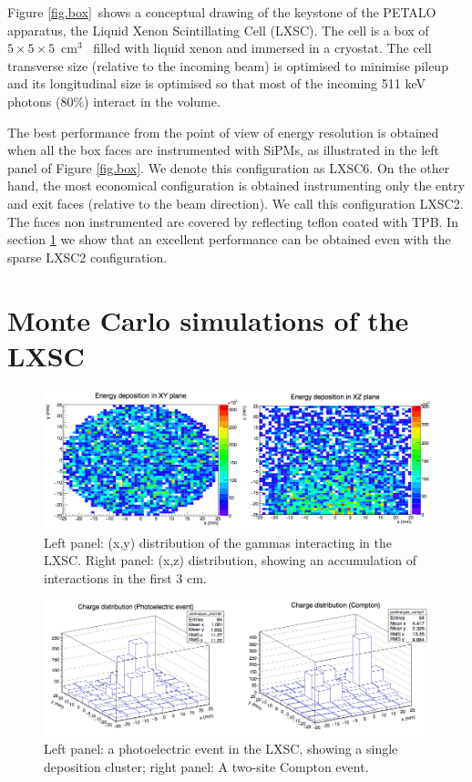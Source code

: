 \documentclass{JINST}
\begin{document}
Figure \ref{fig.box}~shows a conceptual drawing of the keystone of the PETALO apparatus, the Liquid Xenon Scintillating Cell (LXSC). The cell is a box of $5\times 5 \times 5$~cm$^3$~ filled with liquid xenon and immersed in a cryostat. The cell transverse size (relative to the incoming beam) is optimised to minimise pileup and its longitudinal size is optimised so that most of the incoming 511 keV photons (80\%) interact in the volume. 

The best performance from the point of view of energy resolution is obtained when all the box faces are instrumented with SiPMs, as illustrated in the left panel of Figure \ref{fig.box}. We denote this configuration as LXSC6. On the other hand, the most economical configuration is obtained instrumenting only the entry and exit faces (relative to the beam direction). We call this configuration LXSC2. 
The faces non instrumented are covered by reflecting teflon coated with TPB. In section \ref{sec.mc} we show that an excellent performance can be obtained even with the sparse LXSC2 configuration. 

\section{Monte Carlo simulations of the LXSC}
\label{sec.mc}

\begin{figure}[!htb]
	\centering
	\includegraphics[scale=0.5]{img/gammas.png}
	\caption{\label{fig.gammas}  Left panel: (x,y) distribution of the gammas interacting in the LXSC. Right panel: (x,z) distribution, showing an accumulation of interactions in the first 3 cm.  }
\end{figure}

\begin{figure}[!htb]
	\centering
	\includegraphics[scale=0.5]{img/Events.png}
	\caption{\label{fig.events}  Left panel: a photoelectric event in the LXSC, showing a single deposition cluster; right panel: A two-site Compton event.  }
\end{figure}
\end{document}

